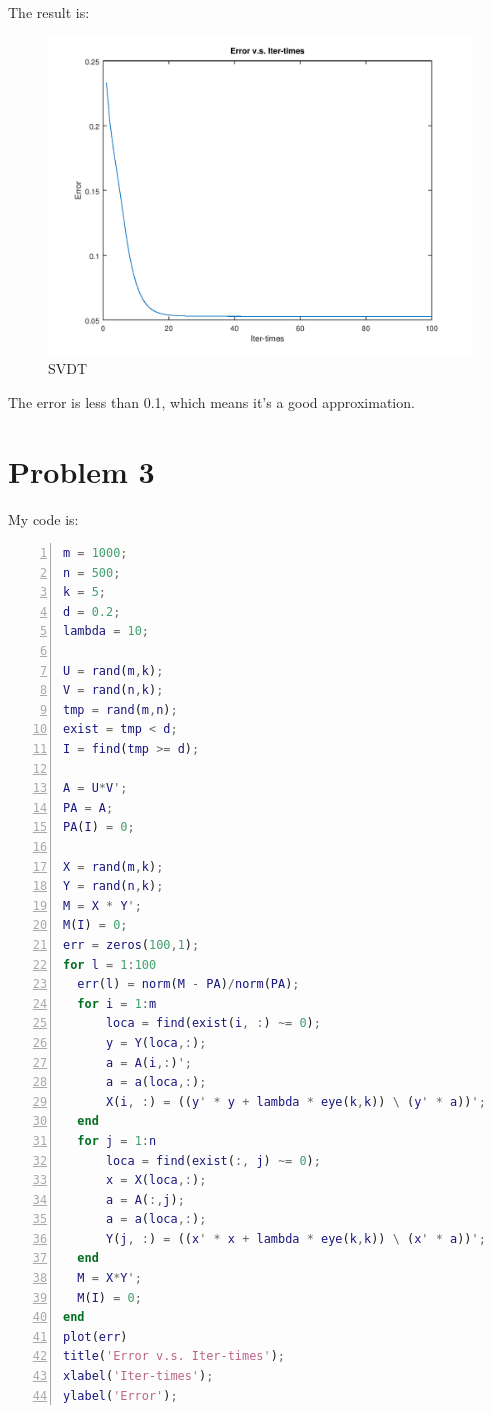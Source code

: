 \documentclass[a4paper, 11pt]{article}
\begin{document}
The result is:
\begin{figure}[htbp]
\centering
	\includegraphics[scale=0.6]{figure/p2.png}
	\caption{SVDT}
	\label{fig3}
\end{figure}

The error is less than 0.1, which means it's a good approximation.

\section*{Problem 3}
My code is:
\begin{lstlisting}[language = Matlab, numbers=left,   
  numberstyle=\tiny,keywordstyle=\color{blue!70},  
  commentstyle=\color{red!50!green!50!blue!50},frame=shadowbox,  
  rulesepcolor=\color{red!20!green!20!blue!20},basicstyle=\ttfamily,
  tabsize=2]
m = 1000;
n = 500;
k = 5;
d = 0.2;
lambda = 10;

U = rand(m,k);
V = rand(n,k);
tmp = rand(m,n);
exist = tmp < d;
I = find(tmp >= d);

A = U*V';
PA = A;
PA(I) = 0;

X = rand(m,k);
Y = rand(n,k);
M = X * Y';
M(I) = 0;
err = zeros(100,1);
for l = 1:100
  err(l) = norm(M - PA)/norm(PA);
  for i = 1:m
	  loca = find(exist(i, :) ~= 0);
	  y = Y(loca,:);
	  a = A(i,:)';
	  a = a(loca,:);
	  X(i, :) = ((y' * y + lambda * eye(k,k)) \ (y' * a))';
  end
  for j = 1:n
	  loca = find(exist(:, j) ~= 0);
	  x = X(loca,:);
	  a = A(:,j);
	  a = a(loca,:);
	  Y(j, :) = ((x' * x + lambda * eye(k,k)) \ (x' * a))';
  end
  M = X*Y';
  M(I) = 0;
end
plot(err)
title('Error v.s. Iter-times');
xlabel('Iter-times');
ylabel('Error');
\end{lstlisting}
\end{document}

